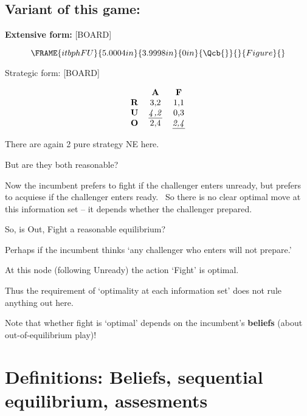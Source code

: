 \documentclass{article}
\begin{document}
\subsection{Variant of this game:}

\textbf{Extensive form: }[BOARD]

\[
\FRAME{itbphFU}{5.0004in}{3.9998in}{0in}{\Qcb{}}{}{Figure}{\special{language
"Scientific Word";type "GRAPHIC";maintain-aspect-ratio TRUE;display
"USEDEF";valid_file "T";width 5.0004in;height 3.9998in;depth
0in;original-width 5.4803in;original-height 3.4396in;cropleft "0";croptop
"1";cropright "1";cropbottom "0";tempfilename
'JSHANV31.wmf';tempfile-properties "XPR";}}
\]

Strategic form: [BOARD]

\[
\begin{tabular}{ccc}
& \textbf{A} & \textbf{F} \\
\textbf{R} & 3,2 & 1,1 \\
\textbf{U} & \underline{\textit{4}}\underline{\textit{,2}} & 0,3 \\
\textbf{O} & 2,4 & \underline{\textit{2,4}}%
\end{tabular}%
\]

There are again 2 pure strategy NE here. \

But are they both reasonable?

\bigskip

Now the incumbent prefers to fight if the challenger enters unready, but
prefers to acquiese if the challenger enters ready. \ So there is no clear
optimal move at this information set -- it depends whether the challenger
prepared.

\bigskip

So, is Out, Fight a reasonable equilibrium?

Perhaps if the incumbent thinks `any challenger who enters will not prepare.'

At this node (following Unready) the action `Fight' is optimal.

Thus the requirement of `optimality at each information set' does not rule
anything out here.

\bigskip

Note that whether fight is `optimal' depends on the incumbent's \textbf{%
beliefs }(about out-of-equilibrium play)!

\bigskip

\section{Definitions: Beliefs, sequential equilibrium, assesments}
\end{document}
